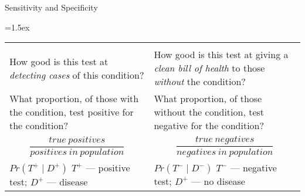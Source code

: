 \begin{frame}{Sensitivity and Specificity}

\tabulinesep=1.5ex
\begin{tabu} to 1.0\textwidth[r]{X[,L,]X[,L,]}
	                                                                    	&
\\
	How good is this test at \textit{detecting cases} of this condition?
	&
	How good is this test at giving a \textit{clean bill of health} to those \textit{without} the condition?
\\\hline
	What proportion, of those with the condition, test positive for the condition?
	&
	What proportion, of those without the condition, test negative for the condition?
\\\hline
	\vspace{-3ex}\begin{displaymath}\frac{true\ positives}{positives\ in\ population}\end{displaymath}\vspace{-3ex}
	&
	\vspace{-3ex}\begin{displaymath}\frac{true\ negatives}{negatives\ in\ population}\end{displaymath}\vspace{-3ex}
\\\hline
	\begin{math}
		Pr(T^{+} \mid D^{+})
	\end{math}
	\newline
	$T^{+}$ --- positive test;\newline
	$D^{+}$ --- disease
	&
	\begin{math}
		Pr(T^{-} \mid D^{-})
	\end{math}
	\newline
	$T^{-}$ --- negative test;\newline
	$D^{+}$ --- no disease
\\
\end{tabu}

\end{frame}


